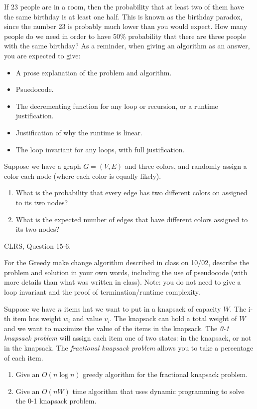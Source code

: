 \documentclass{article}
\author{TODO-Your Group Number and Names Here}
\date{due: 18 October 2019}
\begin{document}
\nextprob
If 23 people are in a room, then the probability that at least two of them have
the same birthday is at least one half.  This is known as the birthday paradox,
since the number 23 is probably much lower than you would expect.  How many
people do we need in order to have 50\% probability that there are three people
with the same birthday?
As a reminder, when giving an algorithm as an answer, you
are expected to give:
\begin{itemize}
    \item A prose explanation of the problem and algorithm.
    \item Psuedocode.
    \item The decrementing function for any loop or recursion, or a runtime
        justification.
    \item Justification of why the runtime is linear.
    \item The loop invariant for any loops, with full justification.
\end{itemize}

\nextprob
Suppose we have a graph $G=(V,E)$ and three colors, and randomly assign a color
each node (where each color is equally likely).
\begin{enumerate}
    \item What is the probability that every edge has two different colors on
        assigned to its two nodes?
    \item What is the expected number of edges that have different colors
        assigned to its two nodes?
\end{enumerate}

\nextprob
CLRS, Question 15-6.

\nextprob
For the Greedy make change algorithm described in class on 10/02, describe the
problem and solution in your own words, including the use of pseudocode (with
more details than what was written in class).  Note: you do not need to give a
loop invariant and the proof of termination/runtime complexity.

\nextprob
Suppose we have $n$ items hat we want to put in a knapsack of capacity $W$.  The i-th item has
weight $w_i$ and value $v_i$.  The knapsack can hold a total weight of $W$ and
we want to maximize the value of the items in the knapsack.
The \emph{0-1 knapsack problem} will assign each item one of two states: in the
knapsack, or not in the knapsack.  The \emph{fractional knapsack problem} allows
you to take a percentage of each item.
\begin{enumerate}
    \item Give an $O(n\log n)$ greedy algorithm for the fractional knapsack problem.
    \item Give an $O(nW)$ time algorithm that uses dynamic programming to solve
        the 0-1 knapsack problem.
\end{enumerate}
\end{document}
